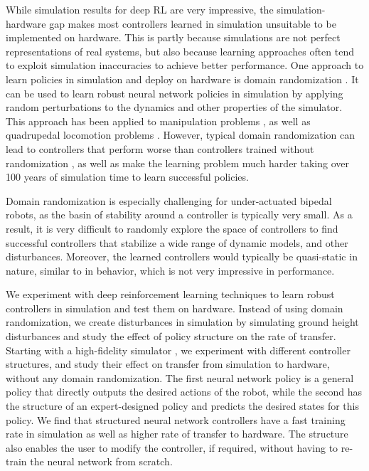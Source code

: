 While simulation results for deep RL are very impressive, the simulation-hardware gap makes most controllers learned in simulation unsuitable to be implemented on hardware. This is partly because simulations are not perfect representations of real systems, but also because learning approaches often tend to exploit simulation inaccuracies to achieve better performance. 
One approach to learn policies in simulation and deploy on hardware is domain randomization \citep{mordatch2015ensemble}. It can be used to learn robust neural network policies in simulation by applying random perturbations to the dynamics and other properties of the simulator. This approach has been applied to manipulation problems \citep{peng2017sim}, as well as quadrupedal locomotion problems \citep{tan2018sim}. However, typical domain randomization can lead to controllers that perform worse than controllers trained without randomization \citep{tan2018sim}, as well as make the learning problem much harder \citep{2018arXiv180800177O} taking over 100 years of simulation time to learn successful policies.   

 Domain randomization is especially challenging for under-actuated bipedal robots, as the basin of stability around a controller is typically very small. As a result, it is very difficult to randomly explore the space of controllers to find successful controllers that stabilize a wide range of dynamic models, and other disturbances. Moreover, the learned controllers would typically be quasi-static in nature, similar to \cite{mordatch2015ensemble} in behavior, which is not very impressive in performance. 
 
We experiment with deep reinforcement learning techniques to learn robust controllers in simulation and test them on hardware. Instead of using domain randomization, we create disturbances in simulation by simulating ground height disturbances and study the effect of policy structure on the rate of transfer. Starting with a high-fidelity simulator \citep{martin2015robust}, we experiment with different controller structures, and study their effect on transfer from simulation to hardware, without any domain randomization. The first neural network policy is a general policy that directly outputs the desired actions of the robot, while the second has the structure of an expert-designed policy and predicts the desired states for this policy. We find that structured neural network controllers have a fast training rate in simulation as well as higher rate of transfer to hardware. The structure also enables the user to modify the controller, if required, without having to re-train the neural network from scratch.


